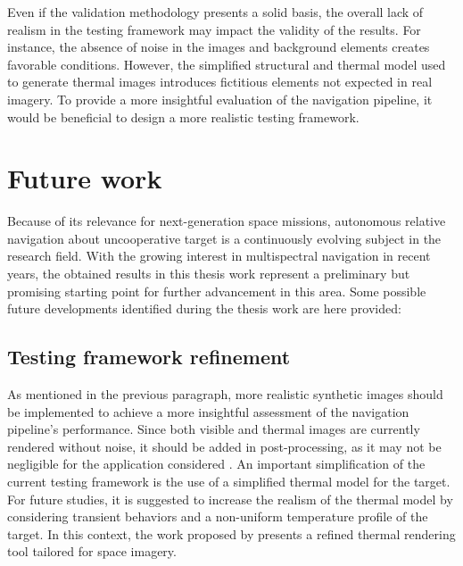 Even if the validation methodology presents a solid basis, the overall lack of realism in the testing framework may impact the validity of the results. For instance, the absence of noise in the images and background elements creates favorable conditions. However, the simplified structural and thermal model used to generate thermal images introduces fictitious elements not expected in real imagery. To provide a more insightful evaluation of the navigation pipeline, it would be beneficial to design a more realistic testing framework. 

\section{Future work}

Because of its relevance for next-generation space missions, autonomous relative navigation about uncooperative target is a continuously evolving subject in the research field. With the growing interest in multispectral navigation in recent years, the obtained results in this thesis work represent a preliminary but promising starting point for further advancement in this area. Some possible future developments identified during the thesis work are here provided:

\subsection*{Testing framework refinement}
As mentioned in the previous paragraph, more realistic synthetic images should be implemented to achieve a more insightful assessment of the navigation pipeline’s performance. Since both visible and thermal images are currently rendered without noise, it should be added in post-processing, as it may not be negligible for the application considered \cite{BECHINI2023358}. An important simplification of the current testing framework is the use of a simplified thermal model for the target. For future studies, it is suggested to increase the realism of the thermal model by considering transient behaviors and a non-uniform temperature profile of the target. In this context, the work proposed by \cite{CIVARDI2023} presents a refined thermal rendering tool tailored for space imagery.

